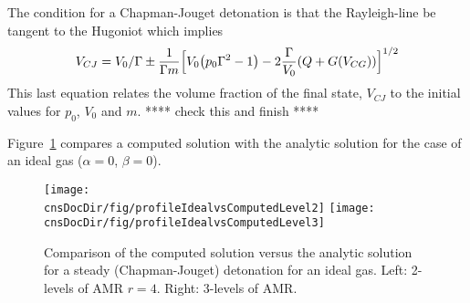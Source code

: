 \documentclass{article}
\newcommand{\obDir}{\homeHenshaw/res/OverBlown}
\newcommand{\cnsDocDir}{../cns}
\begin{document}

The condition for a Chapman-Jouget detonation is that the Rayleigh-line be tangent to the Hugoniot
which implies
\[
   V_{CJ} = V_0/\Gamma \pm 
    {1\over \Gamma m} \Big[ V_0\big( p_0 \Gamma^2 -1\big) -2 {\Gamma\over V_0} ( Q+G(V_{CG})) \Big]^{1/2}
\] 
This last equation relates the volume fraction of the final state, $V_{CJ}$ to the initial values
for $p_0$, $V_0$ and $m$. **** check this and finish ****

Figure~\ref{fig:detonationCJIdealComparison} compares a computed solution with the analytic solution
for the case of an ideal gas ($\alpha=0$, $\beta=0$).
\begin{figure}[hbt]
\begin{center}
  \texttt{[image: \\cnsDocDir/fig/profileIdealvsComputedLevel2]}
  \texttt{[image: \\cnsDocDir/fig/profileIdealvsComputedLevel3]}
 \end{center}
\caption{Comparison of the computed solution versus the analytic solution for a steady (Chapman-Jouget) detonation for an ideal gas. Left: 2-levels of AMR $r=4$. Right: 3-levels of AMR. } \label{fig:detonationCJIdealComparison}
\end{figure}




\end{document}
